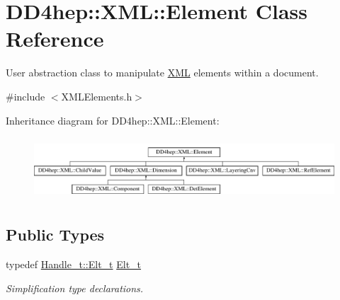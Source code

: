 \hypertarget{class_d_d4hep_1_1_x_m_l_1_1_element}{}\section{D\+D4hep\+:\+:X\+ML\+:\+:Element Class Reference}
\label{class_d_d4hep_1_1_x_m_l_1_1_element}


User abstraction class to manipulate \hyperlink{namespace_d_d4hep_1_1_x_m_l}{X\+ML} elements within a document.  




{\ttfamily \#include $<$X\+M\+L\+Elements.\+h$>$}

Inheritance diagram for D\+D4hep\+:\+:X\+ML\+:\+:Element\+:\begin{figure}[H]
\begin{center}
\leavevmode
\includegraphics[height=2.359551cm]{class_d_d4hep_1_1_x_m_l_1_1_element}
\end{center}
\end{figure}
\subsection*{Public Types}
\begin{DoxyCompactItemize}
\item 
typedef \hyperlink{class_d_d4hep_1_1_x_m_l_1_1_handle__t_a81a72155f29971b37652430a334a6b30}{Handle\+\_\+t\+::\+Elt\+\_\+t} \hyperlink{class_d_d4hep_1_1_x_m_l_1_1_element_af63782f6873c3d8c9b28e1777cde9275}{Elt\+\_\+t}
\begin{DoxyCompactList}\small\item\em Simplification type declarations. \end{DoxyCompactList}\end{DoxyCompactItemize}
